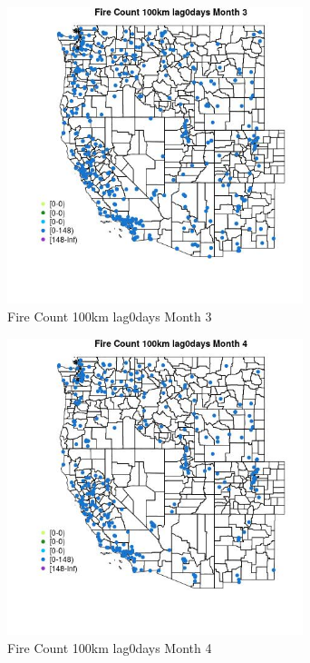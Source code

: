 \begin{figure} 
\centering  
\includegraphics[width=0.77\textwidth]{Code_Outputs/Report_ML_input_PM25_Step4_part_e_de_duplicated_aves_compiled_2019-05-18wNAs_MapObsMo3Fire_Count_100km_lag0days.jpg} 
\caption{\label{fig:Report_ML_input_PM25_Step4_part_e_de_duplicated_aves_compiled_2019-05-18wNAsMapObsMo3Fire_Count_100km_lag0days}Fire Count 100km lag0days Month 3} 
\end{figure} 
 

\begin{figure} 
\centering  
\includegraphics[width=0.77\textwidth]{Code_Outputs/Report_ML_input_PM25_Step4_part_e_de_duplicated_aves_compiled_2019-05-18wNAs_MapObsMo4Fire_Count_100km_lag0days.jpg} 
\caption{\label{fig:Report_ML_input_PM25_Step4_part_e_de_duplicated_aves_compiled_2019-05-18wNAsMapObsMo4Fire_Count_100km_lag0days}Fire Count 100km lag0days Month 4} 
\end{figure} 
 

